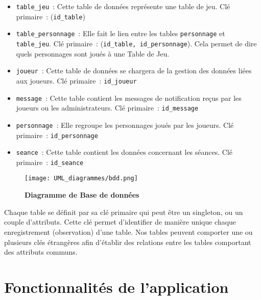 \documentclass[11pt]{article}
\begin{document}
\begin{itemize}
    \item \texttt{table\_jeu}~: Cette table de données représente une table de jeu. Clé primaire~: (\texttt{id\_table})
    
    \item \texttt{table\_personnage}~: Elle fait le lien entre les tables \texttt{personnage} et \texttt{table\_jeu}. Clé primaire~: (\texttt{id\_table, id\_personnage}). Cela permet de dire quels personnages sont joués à une Table de Jeu.
    
    \item \texttt{joueur}~: Cette table de données se chargera de la gestion des données liées aux joueurs. Clé primaire~: \texttt{id\_joueur}
 
    \item \texttt{message}~: Cette table contient les messages de notification reçus par les joueurs ou les administrateurs. Clé primaire~: \texttt{id\_message}
    
    \item \texttt{personnage}~: Elle regroupe les personnages joués par les joueurs. Clé primaire~: \texttt{id\_personnage}
    
    \item \texttt{seance}~: Cette table contient les données concernant les séances. Clé primaire~: \texttt{id\_seance}

\end{itemize}


\begin{figure}[H]
    \caption{\textbf{Diagramme de Base de données}}
    \label{UML_bdd}
    \centering
    \texttt{[image: UML\_diagrammes/bdd.png]}
\end{figure}


Chaque table se définit par sa clé primaire qui peut être un singleton, ou un couple d'attributs. Cette clé permet d'identifier de manière unique chaque enregistrement (observation) d'une table. Nos tables peuvent comporter une ou plusieurs clés étrangères afin d'établir des relations entre les tables comportant des attributs communs.




\newpage
\section{Fonctionnalités de l'application}
\end{document}
